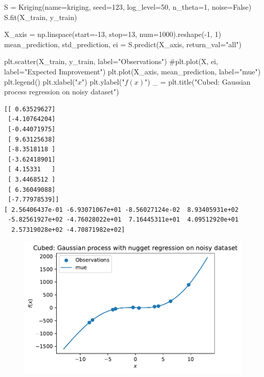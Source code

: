 \documentclass[
  letterpaper,
  DIV=11,
  numbers=noendperiod]{scrreprt}
\newenvironment{Shaded}{\begin{snugshade}}{\end{snugshade}}
\newcommand{\CommentTok}[1]{\textcolor[rgb]{0.37,0.37,0.37}{#1}}
\newcommand{\DecValTok}[1]{\textcolor[rgb]{0.68,0.00,0.00}{#1}}
\newcommand{\NormalTok}[1]{\textcolor[rgb]{0.00,0.23,0.31}{#1}}
\newcommand{\OperatorTok}[1]{\textcolor[rgb]{0.37,0.37,0.37}{#1}}
\newcommand{\StringTok}[1]{\textcolor[rgb]{0.13,0.47,0.30}{#1}}
\newcommand{\VariableTok}[1]{\textcolor[rgb]{0.07,0.07,0.07}{#1}}
\begin{document}
\begin{Shaded}
\begin{Highlighting}[]
\NormalTok{S }\OperatorTok{=}\NormalTok{ Kriging(name}\OperatorTok{=}\StringTok{\textquotesingle{}kriging\textquotesingle{}}\NormalTok{,  seed}\OperatorTok{=}\DecValTok{123}\NormalTok{, log\_level}\OperatorTok{=}\DecValTok{50}\NormalTok{, n\_theta}\OperatorTok{=}\DecValTok{1}\NormalTok{, noise}\OperatorTok{=}\VariableTok{False}\NormalTok{)}
\NormalTok{S.fit(X\_train, y\_train)}

\NormalTok{X\_axis }\OperatorTok{=}\NormalTok{ np.linspace(start}\OperatorTok{={-}}\DecValTok{13}\NormalTok{, stop}\OperatorTok{=}\DecValTok{13}\NormalTok{, num}\OperatorTok{=}\DecValTok{1000}\NormalTok{).reshape(}\OperatorTok{{-}}\DecValTok{1}\NormalTok{, }\DecValTok{1}\NormalTok{)}
\NormalTok{mean\_prediction, std\_prediction, ei }\OperatorTok{=}\NormalTok{ S.predict(X\_axis, return\_val}\OperatorTok{=}\StringTok{"all"}\NormalTok{)}

\NormalTok{plt.scatter(X\_train, y\_train, label}\OperatorTok{=}\StringTok{"Observations"}\NormalTok{)}
\CommentTok{\#plt.plot(X, ei, label="Expected Improvement")}
\NormalTok{plt.plot(X\_axis, mean\_prediction, label}\OperatorTok{=}\StringTok{"mue"}\NormalTok{)}
\NormalTok{plt.legend()}
\NormalTok{plt.xlabel(}\StringTok{"$x$"}\NormalTok{)}
\NormalTok{plt.ylabel(}\StringTok{"$f(x)$"}\NormalTok{)}
\NormalTok{\_ }\OperatorTok{=}\NormalTok{ plt.title(}\StringTok{"Cubed: Gaussian process regression on noisy dataset"}\NormalTok{)}
\end{Highlighting}
\end{Shaded}

\begin{verbatim}
[[ 0.63529627]
 [-4.10764204]
 [-0.44071975]
 [ 9.63125638]
 [-8.3518118 ]
 [-3.62418901]
 [ 4.15331   ]
 [ 3.4468512 ]
 [ 6.36049088]
 [-7.77978539]]
[ 2.56406437e-01 -6.93071067e+01 -8.56027124e-02  8.93405931e+02
 -5.82561927e+02 -4.76028022e+01  7.16445311e+01  4.09512920e+01
  2.57319028e+02 -4.70871982e+02]
\end{verbatim}

\begin{figure}[H]

{\centering \includegraphics{012_num_spot_ei_files/figure-pdf/cell-54-output-2.pdf}

}

\end{figure}
\end{document}
